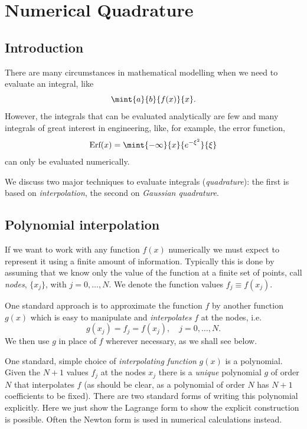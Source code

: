 \chapter[Quadrature]{Numerical Quadrature}

\section{Introduction}

There are many circumstances in mathematical modelling when we need to
evaluate an integral, like
%
\begin{equation}
 \mint{a}{b}{f(x)}{x} .\label{Qua:eq:1}
\end{equation}
%
However, the integrals that can be evaluated analytically are few and
many integrals of great interest in engineering, like, for example,
the error function,
%
\begin{equation}
 \mbox{Erf}(x) = \mint{-\infty}{x}{e^{-\xi^2}}{\xi} \label{Qua:eq:2}
\end{equation}
%
can only be evaluated numerically.

We discuss two major techniques to evaluate integrals
(\textit{quadrature}): the first is based on \textit{interpolation},
the second on \textit{Gaussian quadrature}.

\section{Polynomial interpolation}

If we want to work with any function $f(x)$ numerically we must expect
to represent it using a finite amount of information. Typically this
is done by assuming that we know only the value of the function at a
finite set of points, call \textit{nodes}, $\{x_j\}$, with
$j=0,\ldots,N$. We denote the function values $f_j \equiv f(x_j)$.

One standard approach is to approximate the function $f$ by another
function $g(x)$ which is easy to manipulate and \textit{interpolates}
$f$ at the nodes, i.e.
%
\begin{equation}
  g(x_j) = f_j = f(x_j), \quad j = 0, \ldots, N.
\end{equation}
%
We then use $g$ in place of $f$ wherever necessary, as we shall see
below.

One standard, simple choice of \textit{interpolating function} $g(x)$
is a polynomial. Given the $N+1$ values $f_j$ at the nodes $x_j$ there
is a \emph{unique} polynomial $g$ of order $N$ that interpolates $f$
(as should be clear, as a polynomial of order $N$ has $N+1$
coefficients to be fixed). There are two standard forms of writing
this polynomial explicitly. Here we just show the Lagrange form to
show the explicit construction is possible. Often the Newton form is
used in numerical calculations instead.

